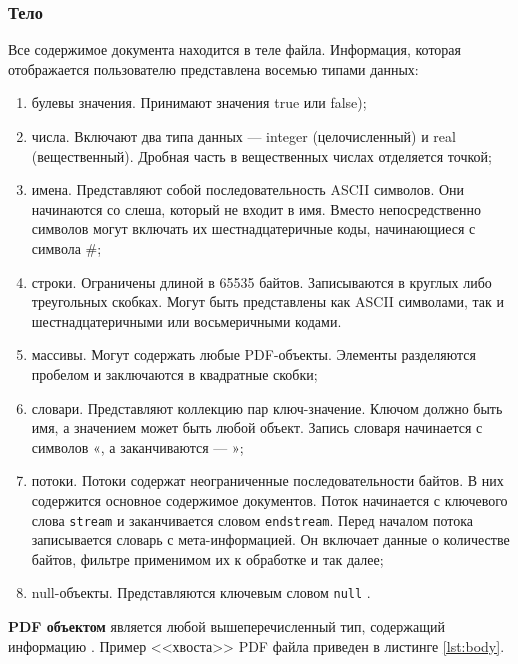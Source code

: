 \subsubsection{Тело}
Все содержимое документа находится в теле файла. Информация, которая отображается пользователю представлена восемью типами данных:
\begin{enumerate}
	\item булевы значения. Принимают значения true или false);
	\item числа. Включают два типа данных — integer (целочисленный) и real (вещественный). Дробная часть в вещественных числах отделяется точкой;
	\item имена. Представляют собой последовательность ASCII символов. Они начинаются со слеша, который не входит в имя. Вместо непосредственно символов могут включать их шестнадцатеричные коды, начинающиеся с символа \#;
	\item строки. Ограничены длиной в 65535 байтов. Записываются в круглых либо треугольных скобках. Могут быть представлены как ASCII символами, так и шестнадцатеричными или восьмеричными кодами.
	\item массивы. Могут содержать любые PDF-объекты. Элементы разделяются пробелом и заключаются в квадратные скобки;
	\item словари. Представляют коллекцию пар ключ-значение. Ключом должно быть имя, а значением может быть любой объект. Запись словаря начинается с символов «, а заканчиваются — »;
	\item потоки. Потоки содержат неограниченные последовательности байтов. В них содержится основное содержимое документов. Поток начинается с ключевого слова \texttt{stream} и заканчивается словом \texttt{endstream}. Перед началом потока записывается словарь с мета-информацией. Он включает данные о количестве байтов, фильтре применимом их к обработке и так далее;
	\item null-объекты. Представляются ключевым словом \texttt{null} \cite{pdf_object_def}.
\end{enumerate}
\textbf{PDF объектом} является любой вышеперечисленный тип, содержащий информацию \cite{pdf_object_def}.
Пример <<хвоста>> PDF файла приведен в листинге \ref{lst:body}.


